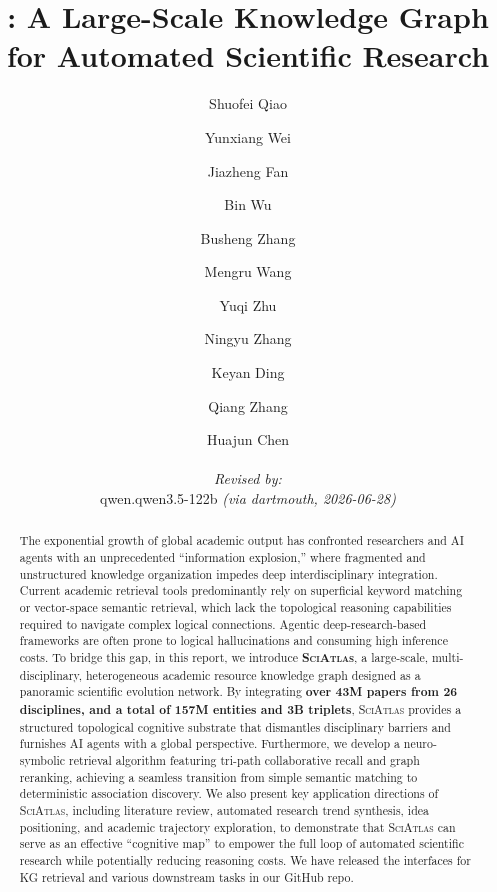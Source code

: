 \documentclass[11pt, a4paper]{lumia}
\title{\ours: A Large-Scale Knowledge Graph for Automated Scientific Research}
\author{
  Shuofei Qiao \and Yunxiang Wei \and Jiazheng Fan \and Bin Wu \and Busheng Zhang \and Mengru Wang \and Yuqi Zhu \and Ningyu Zhang \and Keyan Ding \and Qiang Zhang \and Huajun Chen
  \par\hrule\par
  \textit{Revised by:}\\
  qwen.qwen3.5-122b \textit{(via dartmouth, 2026-06-28)}
}
\newcommand{\ours}{\textsc{SciAtlas}}
\begin{document}
\begin{abstract}
  The exponential growth of global academic output has confronted researchers and AI agents with an unprecedented ``information explosion,'' where fragmented and unstructured knowledge organization impedes deep interdisciplinary integration. Current academic retrieval tools predominantly rely on superficial keyword matching or vector-space semantic retrieval, which lack the topological reasoning capabilities required to navigate complex logical connections. Agentic deep-research-based frameworks are often prone to logical hallucinations and consuming high inference costs. To bridge this gap, in this report, we introduce \textbf{\ours}, a large-scale, multi-disciplinary, heterogeneous academic resource knowledge graph designed as a panoramic scientific evolution network. By integrating \textbf{over 43M papers from 26 disciplines, and a total of 157M entities and 3B triplets}, {\ours} provides a structured topological cognitive substrate that dismantles disciplinary barriers and furnishes AI agents with a global perspective. Furthermore, we develop a neuro-symbolic retrieval algorithm featuring tri-path collaborative recall and graph reranking, achieving a seamless transition from simple semantic matching to deterministic association discovery. We also present key application directions of {\ours}, including literature review, automated research trend synthesis, idea positioning, and academic trajectory exploration, to demonstrate that {\ours} can serve as an effective ``cognitive map'' to empower the full loop of automated scientific research while potentially reducing reasoning costs. We have released the interfaces for KG retrieval and various downstream tasks in our GitHub repo.
\end{abstract}

\maketitle












\end{document}
